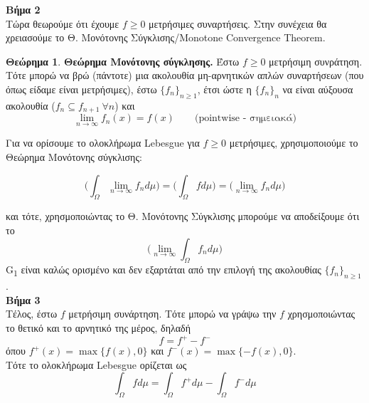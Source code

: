 \documentclass[12pt,a4paper]{article}
\theoremstyle{definition}
\numberwithin{equation}{section}
\newtheorem{theorima}{Θεώρημα}
\begin{document}
{\textbf{Bήμα 2}\\
Τώρα θεωρούμε ότι έχουμε \(f\geq 0\) μετρήσιμες συναρτήσεις. Στην συνέχεια θα χρειασούμε το Θ. Μονότονης Σύγκλισης/\textlatin{Monotone Convergence Theorem}.

\begin{theorima}\textbf{Θεώρημα Μονότονης σύγκλησης.} Έστω $f\geq 0$ μετρήσιμη συνράτηση. Τότε μπορώ να βρώ (πάντοτε) μια ακολουθία μη-αρνητικών απλών συναρτήσεων (που όπως
είδαμε είναι μετρήσιμες), έστω $\{f_n\}_{n\geq 1}$, έτσι ώστε η $\{f_n\}_n$ να είναι αύξουσα ακολουθία ($f_n \subseteq f_{n+1}\: \forall n$) και
$$\lim_{n\rightarrow \infty} f_n(x) = f(x) \qquad \text{(pointwise - σημειακά)}$$
\end{theorima}
\pagebreak

Για να ορίσουμε το ολοκλήρωμα \textlatin{Lebesgue} για \(f\geq 0\) μετρήσιμες, χρησιμοποιούμε το Θεώρημα Μονότονης σύγκλισης:

$$ \Big( \int_\Omega \lim_{n\rightarrow \infty} f_n d\mu \Big) = \Big( \int_\Omega f d\mu \Big) = \Big( \lim_{n\rightarrow \infty} f_n d\mu \Big) $$

και τότε, χρησμοποιώντας το Θ. Μονότονης Σύγκλισης μπορούμε να αποδείξουμε ότι το
$$\Big( \lim_{n\rightarrow \infty} \int_\Omega f_n d\mu \Big)$$G\textsubscript{1}
είναι καλώς ορισμένο και δεν εξαρτάται από την επιλογή της ακολουθίας \(\{f_n\}_{n\geq 1}\).\\

\textbf{Βήμα 3}\\
Τέλος, έστω \(f\) μετρήσιμη συνάρτηση. Τότε μπορώ να γράψω την \(f\) χρησμοποιώντας το θετικό και το αρνητικό της μέρος, δηλαδή
$$ f = f^+ - f^-$$
όπου \(f^+(x)= \max \{ f(x), 0\}\) και \(f^-(x) = \max \{-f(x),0\}\).\\
Τότε το ολοκλήρωμα \textlatin{Lebesgue} ορίζεται ως
$$\int_\Omega f d\mu = \int_\Omega f^+ d\mu - \int_\Omega f^- d\mu $$
\pagebreak

}
\end{document}
